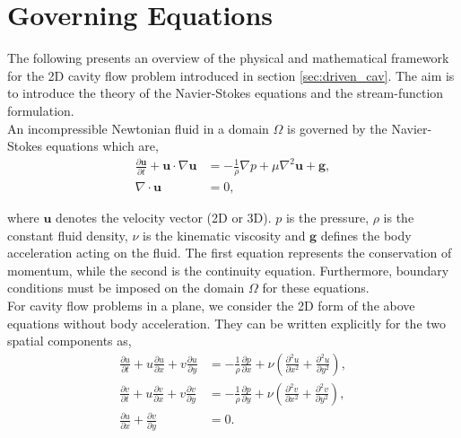 
\section{Governing Equations} \label{sec:gov_equ}

The following presents an overview of the physical and mathematical framework
for the 2D cavity flow problem introduced in section \ref{sec:driven_cav}. The
aim is to introduce the theory of the Navier-Stokes equations and the
stream-function formulation. \\

An incompressible Newtonian fluid in a domain $\Omega$ is governed by the
Navier-Stokes equations which are,
\vspace{-10pt}
\begin{align}
\frac{\partial \mathbf{u}}{\partial t} + 
  \mathbf{u} \cdot \nabla \mathbf{u} &= 
  - \frac{1}{\rho} \nabla p + \mu \nabla^2 \mathbf{u} + \mathbf{g},
  \label{eq:ns3d} \\
\nabla \cdot \mathbf{u} &= 0 \label{eq:cont3d},
\end{align}

where $\mathbf{u}$ denotes the velocity vector (2D or 3D). $p$ is the pressure,
$\rho$ is the constant fluid density, $\nu$ is the kinematic viscosity and
$\mathbf{g}$ defines the body acceleration acting on the fluid. The first
equation represents the conservation of momentum, while the second is the
continuity equation. Furthermore, boundary conditions must be imposed on the
domain $\Omega$ for these equations. \\

For cavity flow problems in a plane, we consider the 2D form of the above
equations without body acceleration. They can be written explicitly for the two
spatial components as,
\begin{align}
\frac{\partial u}{\partial t} + u \frac{\partial u}{\partial x} 
  + v \frac{\partial u}{\partial y} &= 
  - \frac{1}{\rho}\frac{\partial p}{\partial x}
  + \nu \left(\frac{\partial^2 u}{\partial x^2}
  + \frac{\partial^2 u}{\partial y^2}\right) \label{eq:ns2d-u}, \\
\frac{\partial v}{\partial t} + u \frac{\partial v}{\partial x}
  + v \frac{\partial v}{\partial y} &=
  - \frac{1}{\rho}\frac{\partial p}{\partial y} 
  + \nu \left(\frac{\partial^2 v}{\partial x^2}
  + \frac{\partial^2 v}{\partial y^2}\right) \label{eq:ns2d-v}, \\ 
\frac{\partial u}{\partial x}
  + \frac{\partial v}{\partial y} &= 0 \label{eq:cont2d}.
\end{align}

